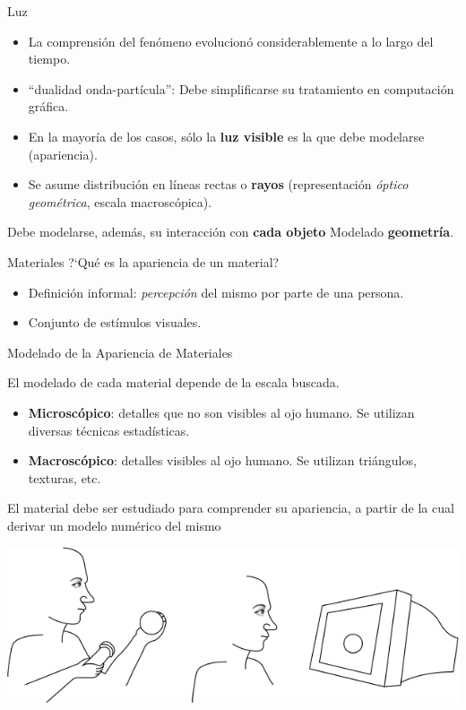 \documentclass[spanish,unknownkeysallowed]{beamer}
\begin{document}
\begin{frame}[Luz]
\begin{block}{Luz}
\begin{itemize}
\item La comprensión del fenómeno evolucionó considerablemente a lo largo del tiempo.
\item ``dualidad onda-partícula'': Debe simplificarse su tratamiento en computación gráfica.
\item En la mayoría de los casos, sólo la \textbf{luz visible} es la que debe modelarse (apariencia).
\item Se asume distribución en líneas rectas o \textbf{rayos} (representación {\em óptico geométrica}, escala macroscópica).
\end{itemize}
\end{block}

\begin{block}{Debe modelarse, además, su interacción con \textbf{cada objeto}}
Modelado \textbf{geometría}.
\end{block}

\end{frame}


\begin{frame}{Materiales}
?`Qué es la apariencia de un material?
\begin{itemize}
\item Definición informal: {\em percepción} del mismo por parte de una persona.
\item Conjunto de estímulos visuales.

\end{itemize}

\end{frame}


\begin{frame}{Modelado de la Apariencia de Materiales}
\begin{block}{El modelado de cada material depende de la escala buscada.}
\begin{itemize}
\item \textbf{Microscópico}: detalles que no son visibles al ojo humano. Se utilizan diversas técnicas estadísticas.
\item \textbf{Macroscópico}: detalles visibles al ojo humano. Se utilizan triángulos, texturas, etc.
\end{itemize}
\end{block}
El material debe ser estudiado para comprender su apariencia, a partir de la cual derivar un modelo numérico del mismo

\centerline{\includegraphics[scale = 0.25]{../figures/apariencia}}
\end{frame}
\end{document}
